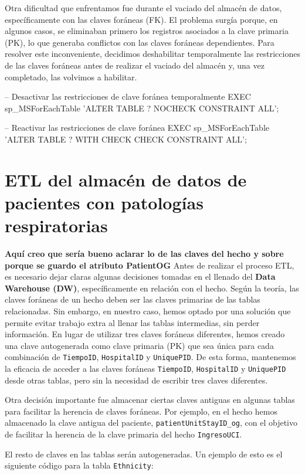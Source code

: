 \documentclass[12pt, a4paper, twoside]{article}
\begin{document}
	Otra dificultad que enfrentamos fue durante el vaciado del almacén de datos, específicamente con las claves foráneas (FK). El problema surgía porque, en algunos casos, se eliminaban primero los registros asociados a la clave primaria (PK), lo que generaba conflictos con las claves foráneas dependientes. Para resolver este inconveniente, decidimos deshabilitar temporalmente las restricciones de las claves foráneas antes de realizar el vaciado del almacén y, una vez completado, las volvimos a habilitar.
	
	-- Desactivar las restricciones de clave foránea temporalmente
	EXEC sp\_MSForEachTable 'ALTER TABLE ? NOCHECK CONSTRAINT ALL';
	
	-- Reactivar las restricciones de clave foránea
	EXEC sp\_MSForEachTable 'ALTER TABLE ? WITH CHECK CHECK CONSTRAINT ALL';
	
	
	\section{ETL del almacén de datos de pacientes con patologías respiratorias}
	
	\textbf{Aquí creo que sería bueno aclarar lo de las claves del hecho y sobre porque se guardo el atributo PatientOG}
	Antes de realizar el proceso ETL, es necesario dejar claras algunas decisiones tomadas en el llenado del \textbf{Data Warehouse (DW)}, específicamente en relación con el hecho. Según la teoría, las claves foráneas de un hecho deben ser las claves primarias de las tablas relacionadas. Sin embargo, en nuestro caso, hemos optado por una solución que permite evitar trabajo extra al llenar las tablas intermedias, sin perder información. En lugar de utilizar tres claves foráneas diferentes, hemos creado una clave autogenerada como clave primaria (PK) que sea única para cada combinación de \texttt{TiempoID}, \texttt{HospitalID} y \texttt{UniquePID}. De esta forma, mantenemos la eficacia de acceder a las claves foráneas \texttt{TiempoID}, \texttt{HospitalID} y \texttt{UniquePID} desde otras tablas, pero sin la necesidad de escribir tres claves diferentes.
	
	Otra decisión importante fue almacenar ciertas claves antiguas en algunas tablas para facilitar la herencia de claves foráneas. Por ejemplo, en el hecho hemos almacenado la clave antigua del paciente, \texttt{patientUnitStayID\_og}, con el objetivo de facilitar la herencia de la clave primaria del hecho \texttt{IngresoUCI}.
	
	El resto de claves en las tablas serán autogeneradas. Un ejemplo de esto es el siguiente código para la tabla \texttt{Ethnicity}:
	
\end{document}
